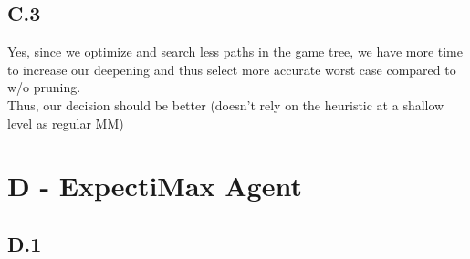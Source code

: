 \documentclass[12pt]{article}
\begin{document}
\begin{comment}
The average branching factor (in the ideal case in which we prune all with ideal children ordering) $b'$ will be $\sqrt[k]{b}$ as the recursion formula (as seen on lecture) for the K case is:
$$T(d)= T(d-1) + (b-1)T(d-(k+1))$$
\end{comment}
\subsection*{C.3}
Yes, since we optimize and search less paths in the game tree, we have more time to increase our deepening and thus select more accurate worst case compared to w/o pruning.\\
Thus, our decision should be better (doesn't rely on the heuristic at a shallow level as regular MM)\\

\section*{D - ExpectiMax Agent}

\subsection*{D.1}
\end{document}
